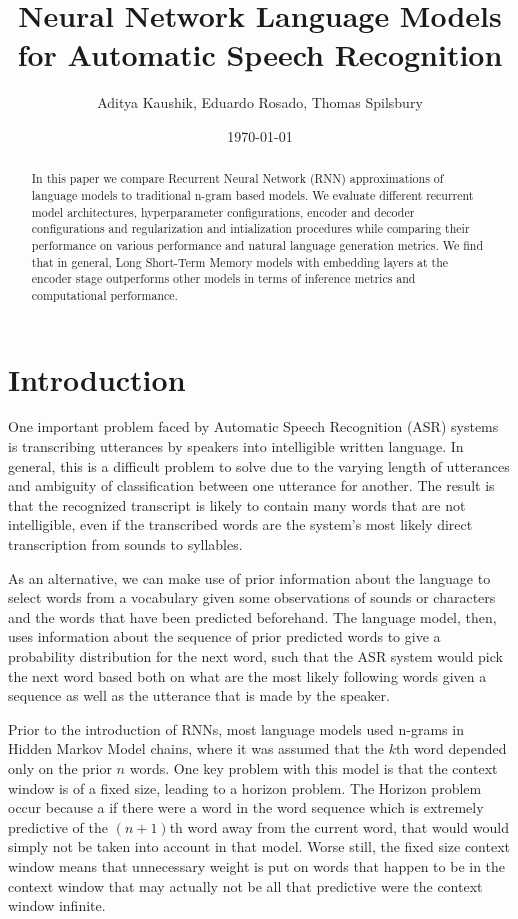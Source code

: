 \documentclass[a4paper]{article}
\title{Neural Network Language Models for Automatic Speech Recognition}
\author{Aditya Kaushik, Eduardo Rosado, Thomas Spilsbury}
\date{\today}
\begin{document}
\maketitle

\begin{abstract}
In this paper we compare Recurrent Neural Network (RNN)
approximations of language models to traditional n-gram based models.
We evaluate different recurrent model architectures, hyperparameter configurations,
encoder and decoder configurations and regularization and intialization procedures
while comparing their performance on various performance and natural language
generation metrics. We find that in general, Long Short-Term Memory models
with embedding layers at the encoder stage outperforms other models
in terms of inference metrics and computational performance.
\end{abstract}

\section{Introduction}
\label{sec:introduction}

One important problem faced by Automatic Speech Recognition (ASR)
systems is transcribing utterances by speakers into intelligible written language.
In general, this is a difficult problem to solve due to the varying length
of utterances and ambiguity of classification between one utterance for another. The result
is that the recognized transcript is likely
to contain many words that are not
intelligible, even if the transcribed words
are the system's most likely direct
transcription from sounds to syllables.

As an alternative, we can make use of prior
information about the language to select
words from a vocabulary given some
observations of sounds or characters and the words
that have been predicted beforehand. The language model,
then, uses information about the sequence of prior
predicted words to give a probability distribution
for the next word, such that the ASR system would
pick the next word based both on what are the most
likely following words given a sequence as well
as the utterance that is made by the speaker.

Prior to the introduction of RNNs, most language models used n-grams
in Hidden Markov Model chains, where it was assumed that the $k$th
word depended only on the prior $n$ words. One key problem
with this model is that the context window is of a fixed size, leading
to a horizon problem. The Horizon problem occur because a if there were a word
in the word sequence which is extremely predictive of the $(n + 1)$th
word away from the current word, that would would simply not be taken
into account in that model. Worse still, the fixed size context window
means that unnecessary weight is put on words that happen to be in the context
window that may actually not be all that predictive were the context window
infinite.
\end{document}
